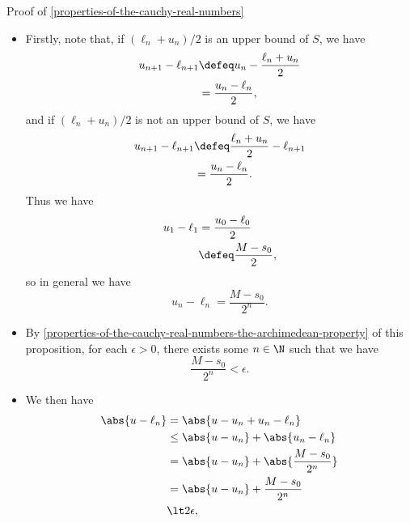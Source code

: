 \begin{Proof}{Proof of \cref{properties-of-the-cauchy-real-numbers}}
\begin{itemize}
\begin{itemize}
                \item Firstly, note that, if $(\ell_{n}+u_{n})/2$ is an upper bound of $S$, we have
                    \begin{align*}
                        u_{n+1}-\ell_{n+1} &\defeq u_{n}-\frac{\ell_{n}+u_{n}}{2}\\
                                           &=      \frac{u_{n}-\ell_{n}}{2},
                    \end{align*}
                    and if $(\ell_{n}+u_{n})/2$ is not an upper bound of $S$, we have
                    \begin{align*}
                        u_{n+1}-\ell_{n+1} &\defeq \frac{\ell_{n}+u_{n}}{2}-\ell_{n+1}\\
                                           &=      \frac{u_{n}-\ell_{n}}{2}.
                    \end{align*}
                    Thus we have
                    \begin{align*}
                        u_{1}-\ell_{1} &=      \frac{u_{0}-\ell_{0}}{2}\\
                                       &\defeq \frac{M-s_{0}}{2},
                    \end{align*}
                    so in general we have
                    \[
                        u_{n}-\ell_{n}%
                        =%
                        \frac{M-s_{0}}{2^{n}}.%
                    \]%
                \item By \cref{properties-of-the-cauchy-real-numbers-the-archimedean-property} of this proposition, for each $\epsilon\gt0$, there exists some $n\in\N$ such that we have
                    \[
                        \frac{M-s_{0}}{2^{n}}%
                        \lt%
                        \epsilon.%
                    \]%
                \item We then have
                    \begin{align*}
                        \abs{u-\ell_{n}} &=     \abs{u-u_{n}+u_{n}-\ell_{n}}\\
                                         &\leq  \abs{u-u_{n}}+\abs{u_{n}-\ell_{n}}\\
                                         &=     \abs{u-u_{n}}+\abs{\frac{M-s_{0}}{2^{n}}}\\
                                         &=     \abs{u-u_{n}}+\frac{M-s_{0}}{2^{n}}\\
                                         &\lt 2\epsilon,%
                    \end{align*}

\end{itemize}
\end{itemize}
\end{Proof}
